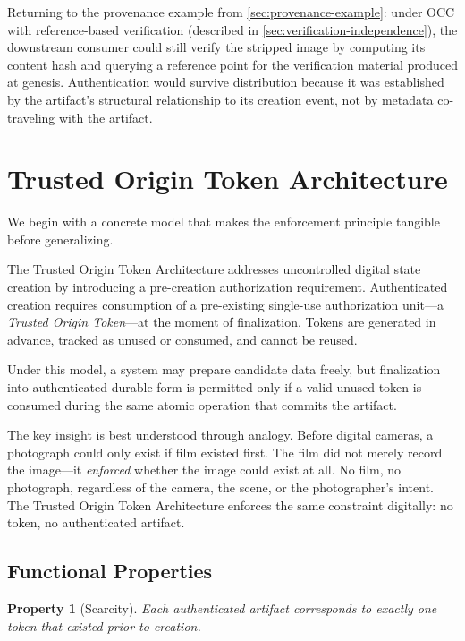 \documentclass[11pt,letterpaper]{article}
\theoremstyle{occplain}
\theoremstyle{occremark}
\newtheorem{property}{Property}[section]
\begin{document}
Returning to the provenance example from \cref{sec:provenance-example}: under OCC with reference-based verification (described in \cref{sec:verification-independence}), the downstream consumer could still verify the stripped image by computing its content hash and querying a reference point for the verification material produced at genesis. Authentication would survive distribution because it was established by the artifact's structural relationship to its creation event, not by metadata co-traveling with the artifact.


\section{Trusted Origin Token Architecture}
\label{sec:tota}

We begin with a concrete model that makes the enforcement principle tangible before generalizing.

The Trusted Origin Token Architecture addresses uncontrolled digital state creation by introducing a pre-creation authorization requirement. Authenticated creation requires consumption of a pre-existing single-use authorization unit---a \emph{Trusted Origin Token}---at the moment of finalization. Tokens are generated in advance, tracked as unused or consumed, and cannot be reused.

Under this model, a system may prepare candidate data freely, but finalization into authenticated durable form is permitted only if a valid unused token is consumed during the same atomic operation that commits the artifact.

The key insight is best understood through analogy. Before digital cameras, a photograph could only exist if film existed first. The film did not merely record the image---it \emph{enforced} whether the image could exist at all. No film, no photograph, regardless of the camera, the scene, or the photographer's intent. The Trusted Origin Token Architecture enforces the same constraint digitally: no token, no authenticated artifact.


\subsection{Functional Properties}
\label{sec:functional-properties}

\begin{property}[Scarcity]
\label{prop:scarcity}
Each authenticated artifact corresponds to exactly one token that existed prior to creation.
\end{property}
\end{document}
